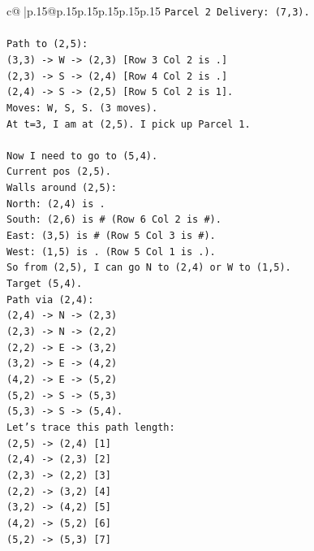 \documentclass{article}
\begin{document}
{\begin{supertabular}{c@{$\;$}|p{.15\linewidth}@{}p{.15\linewidth}p{.15\linewidth}p{.15\linewidth}p{.15\linewidth}p{.15\linewidth}}
{{{\texttt{Parcel 2 Delivery: (7,3).} \\
\\ 
\texttt{Path to (2,5):} \\
\texttt{(3,3) {-}> W {-}> (2,3) {[}Row 3 Col 2 is .{]}} \\
\texttt{(2,3) {-}> S {-}> (2,4) {[}Row 4 Col 2 is .{]}} \\
\texttt{(2,4) {-}> S {-}> (2,5) {[}Row 5 Col 2 is 1{]}.} \\
\texttt{Moves: W, S, S. (3 moves).} \\
\texttt{At t=3, I am at (2,5). I pick up Parcel 1.} \\
\\ 
\texttt{Now I need to go to (5,4).} \\
\texttt{Current pos (2,5).} \\
\texttt{Walls around (2,5):} \\
\texttt{North: (2,4) is .} \\
\texttt{South: (2,6) is \# (Row 6 Col 2 is \#).} \\
\texttt{East: (3,5) is \# (Row 5 Col 3 is \#).} \\
\texttt{West: (1,5) is . (Row 5 Col 1 is .).} \\
\texttt{So from (2,5), I can go N to (2,4) or W to (1,5).} \\
\texttt{Target (5,4).} \\
\texttt{Path via (2,4):} \\
\texttt{(2,4) {-}> N {-}> (2,3)} \\
\texttt{(2,3) {-}> N {-}> (2,2)} \\
\texttt{(2,2) {-}> E {-}> (3,2)} \\
\texttt{(3,2) {-}> E {-}> (4,2)} \\
\texttt{(4,2) {-}> E {-}> (5,2)} \\
\texttt{(5,2) {-}> S {-}> (5,3)} \\
\texttt{(5,3) {-}> S {-}> (5,4).} \\
\texttt{Let's trace this path length:} \\
\texttt{(2,5) {-}> (2,4) {[}1{]}} \\
\texttt{(2,4) {-}> (2,3) {[}2{]}} \\
\texttt{(2,3) {-}> (2,2) {[}3{]}} \\
\texttt{(2,2) {-}> (3,2) {[}4{]}} \\
\texttt{(3,2) {-}> (4,2) {[}5{]}} \\
\texttt{(4,2) {-}> (5,2) {[}6{]}} \\
\texttt{(5,2) {-}> (5,3) {[}7{]}} \\
}}}
\end{supertabular}}
\end{document}
